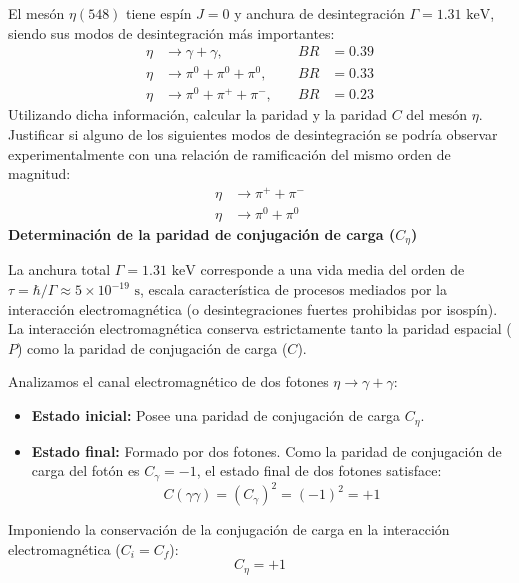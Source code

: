 \newpage
\begin{problema}
El mesón $\eta(548)$ tiene espín $J = 0$ y anchura de desintegración $\Gamma = 1.31 \text{ keV}$, siendo sus modos de desintegración más importantes:
\begin{align*}
    \eta &\to \gamma + \gamma, \quad &BR &= 0.39 \\
    \eta &\to \pi^0 + \pi^0 + \pi^0, \quad &BR &= 0.33 \\
    \eta &\to \pi^0 + \pi^+ + \pi^-, \quad &BR &= 0.23
\end{align*}
Utilizando dicha información, calcular la paridad y la paridad $C$ del mesón $\eta$. Justificar si alguno de los siguientes modos de desintegración se podría observar experimentalmente con una relación de ramificación del mismo orden de magnitud:
\begin{align*}
    \eta &\to \pi^+ + \pi^- \\
    \eta &\to \pi^0 + \pi^0
\end{align*}
\tcblower
\textbf{Determinación de la paridad de conjugación de carga ($C_\eta$)}

La anchura total $\Gamma = 1.31 \text{ keV}$ corresponde a una vida media del orden de $\tau = \hbar / \Gamma \approx 5 \times 10^{-19} \text{ s}$, escala característica de procesos mediados por la interacción electromagnética (o desintegraciones fuertes prohibidas por isospín). La interacción electromagnética conserva estrictamente tanto la paridad espacial ($P$) como la paridad de conjugación de carga ($C$).

Analizamos el canal electromagnético de dos fotones $\eta \to \gamma + \gamma$:
\begin{itemize}
    \item \textbf{Estado inicial:} Posee una paridad de conjugación de carga $C_\eta$.
    \item \textbf{Estado final:} Formado por dos fotones. Como la paridad de conjugación de carga del fotón es $C_\gamma = -1$, el estado final de dos fotones satisface:
    \begin{equation*}
        C(\gamma \gamma) = (C_\gamma)^2 = (-1)^2 = +1
    \end{equation*}
\end{itemize}
Imponiendo la conservación de la conjugación de carga en la interacción electromagnética ($C_i = C_f$):
\begin{equation*}
    C_\eta = +1
\end{equation*}


\end{problema}
